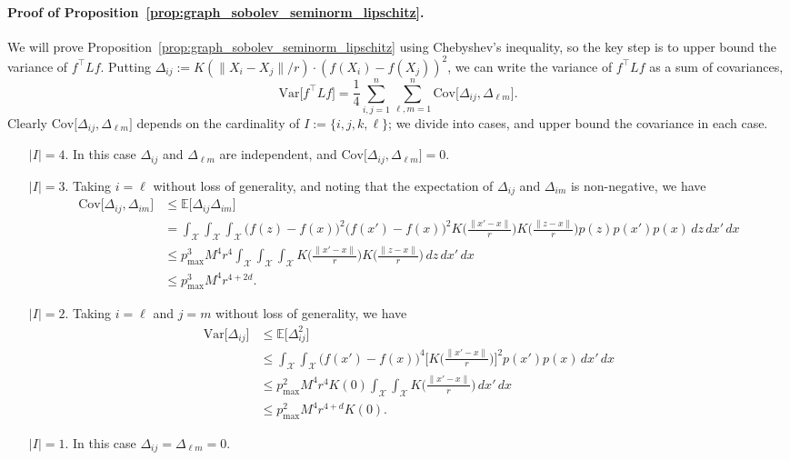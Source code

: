 \documentclass[twoside]{article}
\newcommand{\Var}{\mathrm{Var}}
\newcommand{\Cov}{\mathrm{Cov}}
\newcommand{\1}{\mathbf{1}}
\newcommand{\Xset}{\mathcal{X}}
\newcommand{\Ebb}{\mathbb{E}}
\theoremstyle{definition}
\theoremstyle{remark}
\begin{document}
\paragraph{Proof of Proposition~\ref{prop:graph_sobolev_seminorm_lipschitz}.}
We will prove Proposition~\ref{prop:graph_sobolev_seminorm_lipschitz} using Chebyshev's inequality, so the key step is to upper bound the variance of $f^{\top}Lf$. Putting $\varDelta_{ij} := K(\|X_i - X_j\|/r) \cdot (f(X_i) - f(X_j))^2$, we can write the variance of $f^{\top} L f$ as a sum of covariances,
\begin{equation*}
\Var\bigl[f^{\top} L f\bigr] = \frac{1}{4} \sum_{i, j = 1}^{n} \sum_{\ell,m = 1}^{n} \Cov\bigl[\varDelta_{ij},\varDelta_{\ell m}\bigr].
\end{equation*}
Clearly $\Cov\bigl[\varDelta_{ij},\varDelta_{\ell m}\bigr]$ depends on the cardinality of $I := \{i,j,k,\ell\}$; we divide into cases, and upper bound the covariance in each case.
\begin{enumerate}
	\item[$\bigl|I\bigr| = 4$.] In this case $\varDelta_{ij}$ and $\varDelta_{\ell m}$ are independent, and $\Cov\bigl[\varDelta_{ij},\varDelta_{\ell m}\bigr] = 0$.
	\item[$\bigl|I\bigr| = 3$.] Taking $i = \ell$ without loss of generality, and noting that the expectation of $\Delta_{ij}$ and $\Delta_{im}$ is non-negative, we have
	\begin{align*}
	\Cov\bigl[\varDelta_{ij},\varDelta_{i m}\bigr] & \leq \Ebb\bigl[\varDelta_{ij} \varDelta_{i m} \bigr] \\
	& = \int_{\Xset} \int_{\Xset} \int_{\Xset} \bigl(f(z) - f(x)\bigr)^2 \bigl(f(x') - f(x)\bigr)^2 K\biggl(\frac{\|x' - x\|}{r}\biggr) K\biggl(\frac{\|z - x\|}{r}\biggr) p(z) p(x') p(x) \,dz \,dx' \,dx \\
	& \leq p_{\max}^3 M^4 r^4 \int_{\Xset} \int_{\Xset} \int_{\Xset} K\biggl(\frac{\|x' - x\|}{r}\biggr) K\biggl(\frac{\|z - x\|}{r}\biggr) \,dz \,dx' \,dx \\
	& \leq p_{\max}^3 M^4 r^{4 + 2d}.
	\end{align*}
	\item[$\bigl|I\bigr| = 2$.] Taking $i = \ell$ and $j = m$ without loss of generality, we have
	\begin{align*}
	\Var\bigl[\varDelta_{ij}\bigr] & \leq \Ebb\bigl[\varDelta_{ij}^2\bigr] \\
	& \leq \int_{\Xset} \int_{\Xset} \bigl(f(x') - f(x)\bigr)^4 \biggl[K\biggl(\frac{\|x' - x\|}{r}\biggr)\biggr]^2 p(x') p(x) \,dx' \,dx \\
	& \leq p_{\max}^2 M^4 r^4 K(0) \int_{\Xset} \int_{\Xset} K\biggl(\frac{\|x' - x\|}{r}\biggr) \,dx' \,dx \\
	& \leq p_{\max}^2 M^4 r^{4 + d} K(0).
	\end{align*}
	\item[$\bigl|I\bigr| = 1$.] In this case $\varDelta_{i j} = \varDelta_{\ell m} = 0$.
\end{enumerate}
\end{document}
